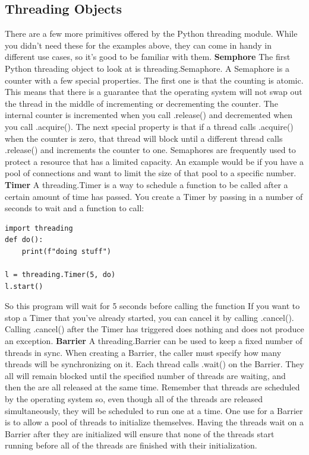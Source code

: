 \documentclass{report}
\begin{document}
    \subsection{Threading Objects}
    \bigbreak \noindent 
    There are a few more primitives offered by the Python threading module. While you didn’t need these for the examples above, they can come in handy in different use cases, so it’s good to be familiar with them.
    \bigbreak \noindent 
    \textbf{Semphore}
    \bigbreak \noindent 
    The first Python threading object to look at is threading.Semaphore. A Semaphore is a counter with a few special properties. The first one is that the counting is atomic. This means that there is a guarantee that the operating system will not swap out the thread in the middle of incrementing or decrementing the counter.
    \bigbreak \noindent 
    The internal counter is incremented when you call .release() and decremented when you call .acquire().
    \bigbreak \noindent 
    The next special property is that if a thread calls .acquire() when the counter is zero, that thread will block until a different thread calls .release() and increments the counter to one.
    \bigbreak \noindent 
    Semaphores are frequently used to protect a resource that has a limited capacity. An example would be if you have a pool of connections and want to limit the size of that pool to a specific number.
    \bigbreak \noindent \bigbreak \noindent 
    \textbf{Timer}
    \bigbreak \noindent 
    A threading.Timer is a way to schedule a function to be called after a certain amount of time has passed. You create a Timer by passing in a number of seconds to wait and a function to call:
    \bigbreak \noindent 
    \begin{mdframed}
        \begin{verbatim}
import threading
def do():
    print(f"doing stuff")

l = threading.Timer(5, do)
l.start()
        \end{verbatim}
    \end{mdframed}
    So this program will wait for 5 seconds before calling the function
    \bigbreak \noindent 
    If you want to stop a Timer that you’ve already started, you can cancel it by calling .cancel(). Calling .cancel() after the Timer has triggered does nothing and does not produce an exception.
    \bigbreak \noindent \bigbreak \noindent 
    \textbf{Barrier}
    \bigbreak \noindent 
    A threading.Barrier can be used to keep a fixed number of threads in sync. When creating a Barrier, the caller must specify how many threads will be synchronizing on it. Each thread calls .wait() on the Barrier. They all will remain blocked until the specified number of threads are waiting, and then the are all released at the same time.
    \bigbreak \noindent 
    Remember that threads are scheduled by the operating system so, even though all of the threads are released simultaneously, they will be scheduled to run one at a time.
    \bigbreak \noindent 
    One use for a Barrier is to allow a pool of threads to initialize themselves. Having the threads wait on a Barrier after they are initialized will ensure that none of the threads start running before all of the threads are finished with their initialization.
    \bigbreak \noindent 
\end{document}
